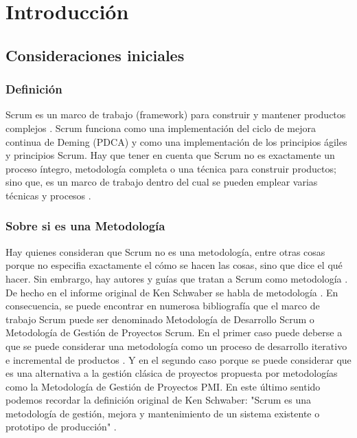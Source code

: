 \chapter{Introducción}

\section{Consideraciones iniciales}

\subsection{Definición}

Scrum es un marco de trabajo (framework) para construir y mantener productos complejos \cite{SBOK-2013} \cite{Scrum-Alliance-2015}. 
Scrum funciona como una implementación del ciclo de mejora continua de Deming (PDCA) y como una implementación de los principios ágiles y principios Scrum. Hay que tener en cuenta que Scrum no es exactamente un proceso íntegro, metodología completa o una técnica para construir productos; sino que, es un marco de trabajo dentro del cual se pueden emplear varias técnicas y procesos \cite{Agile-Atlas-2012}. 

\subsection{Sobre si es una Metodología}

Hay quienes consideran que Scrum no es una metodología, entre otras cosas porque no especifia exactamente el cómo se hacen las cosas, 
sino que dice el qué hacer. Sin embrargo, hay autores y guías que tratan a Scrum como metodología \cite{SBOK-2013}. De hecho en el informe original de Ken Schwaber se habla de metodología \cite{Ken-Schwaber-1995}. En consecuencia, se puede encontrar en numerosa bibliografía que el marco de trabajo Scrum puede ser denominado Metodología de Desarrollo Scrum o Metodología de Gestión de Proyectos Scrum. 
En el primer caso puede deberse a que se puede considerar una metodología como un proceso de desarrollo iterativo e incremental de productos \cite{Ken-Schwaber-1995}. Y en el segundo caso porque se puede considerar que es una alternativa a la gestión clásica de proyectos propuesta por metodologías como la Metodología de Gestión de Proyectos PMI. En este último sentido podemos recordar la definición original de Ken Schwaber: "Scrum es una metodología de gestión, mejora y mantenimiento de un sistema existente o prototipo de producción" \cite{Ken-Schwaber-1995}.
 

